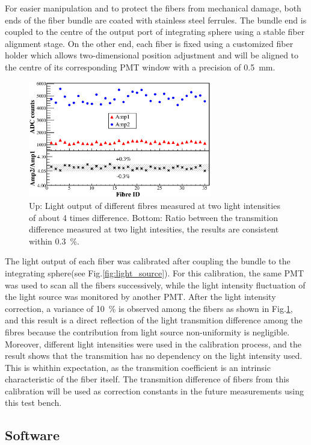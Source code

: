 \documentclass[5p, times]{elsarticle}
\begin{document}
For easier manipulation and to protect the fibers from mechanical damage, both ends of the fiber bundle are coated with stainless steel ferrules.
The bundle end is coupled to the centre of the output port of integrating sphere using a stable fiber alignment stage.
On the other end, each fiber is fixed using a customized fiber holder which allows two-dimensional position adjustment and will be aligned to the centre of its corresponding PMT window with a precision of \SI{0.5}{\milli\meter}.

\begin{figure}
 \centering
 \includegraphics[width=80mm]{fibre_diff}
\caption{Up: Light output of different fibres measured at two light intensities of about 4 times difference.
Bottom: Ratio between the transmition difference measured at two light intesities, the results are consistent within \textpm\SI{0.3}{\percent}.}
\label{fig:fibre_diff}
\end{figure} 

The light output of each fiber was calibrated after coupling the bundle to the integrating sphere(see Fig.\ref{fig:light_source}).
For this calibration, the same PMT was used to scan all the fibers successively, while the light intensity fluctuation of the light source was monitored by another PMT.
After the light intensity correction, a variance of \SI{10}{\percent} is observed among the fibers as shown in Fig.\ref{fig:fibre_diff}, and this result is a direct reflection of the light transmition difference among the fibres because the contribution from light source non-uniformity is negligible.
Moreover, different light intensities were used in the calibration process, and the result shows that the transmition has no dependency on the light intensity used. 
This is whithin expectation, as the transmition coefficient is an intrinsic characteristic of the fiber itself.
The transmition difference of fibers from this calibration will be used as correction constants in the future measurements using this test bench.

\subsection{Software}
\label{sec:software}
\end{document}
